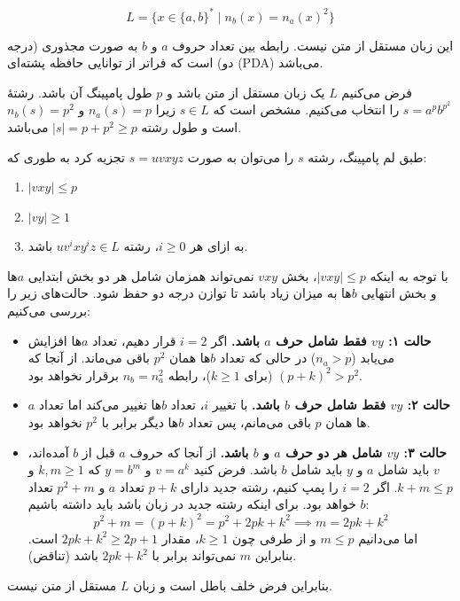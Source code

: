 \[
L = \{x \in \{a,b\}^* \mid n_b(x) = n_a(x)^2\}
\]

 این زبان مستقل از متن {نیست}. رابطه بین تعداد حروف $a$ و $b$ به صورت مجذوری (درجه دو) است که فراتر از توانایی حافظه پشته‌ای (PDA) می‌باشد.

فرض می‌کنیم $L$ یک زبان مستقل از متن باشد و $p$ طول پامپینگ آن باشد. 
رشتهٔ $s = a^p b^{p^2}$ را انتخاب می‌کنیم. مشخص است که $s \in L$ زیرا $n_a(s) = p$ و $n_b(s) = p^2$ است و طول رشته $|s| = p + p^2 \ge p$ می‌باشد.

طبق لم پامپینگ، رشته $s$ را می‌توان به صورت $s = uvxyz$ تجزیه کرد به طوری که:
\begin{enumerate}
    \item $|vxy| \le p$
    \item $|vy| \ge 1$
    \item به ازای هر $i \ge 0$، رشته $u v^i x y^i z \in L$ باشد.
\end{enumerate}

با توجه به اینکه $|vxy| \le p$، بخش $vxy$ نمی‌تواند همزمان شامل هر دو بخش ابتدایی $a$ها و بخش انتهایی $b$ها به میزان زیاد باشد تا توازن درجه دو حفظ شود. حالت‌های زیر را بررسی می‌کنیم:
\begin{itemize}
    \item \textbf{حالت ۱: $vy$ فقط شامل حرف $a$ باشد.}
    اگر $i=2$ قرار دهیم، تعداد $a$ها افزایش می‌یابد ($n_a > p$) در حالی که تعداد $b$ها همان $p^2$ باقی می‌ماند. از آنجا که $(p+k)^2 > p^2$ (برای $k \ge 1$)، رابطه $n_b = n_a^2$ برقرار نخواهد بود.
    
    \item \textbf{حالت ۲: $vy$ فقط شامل حرف $b$ باشد.}
    با تغییر $i$، تعداد $b$ها تغییر می‌کند اما تعداد $a$ها همان $p$ باقی می‌مانم، پس تعداد $b$ها دیگر برابر با $p^2$ نخواهد بود.
    
    \item \textbf{حالت ۳: $vy$ شامل هر دو حرف $a$ و $b$ باشد.}
    از آنجا که حروف $a$ قبل از $b$ آمده‌اند، $v$ باید شامل $a$ و $y$ باید شامل $b$ باشد. فرض کنید $v = a^k$ و $y = b^m$ که $k, m \ge 1$ و $k+m \le p$.
    اگر $i=2$ را پمپ کنیم، رشته جدید دارای $p+k$ تعداد $a$ و $p^2+m$ تعداد $b$ خواهد بود. برای اینکه رشته جدید در زبان باشد باید داشته باشیم:
    \[ p^2 + m = (p+k)^2 = p^2 + 2pk + k^2 \implies m = 2pk + k^2 \]
    اما می‌دانیم $m \le p$ و از طرفی چون $k \ge 1$، مقدار $2pk + k^2 \ge 2p + 1$ است. بنابراین $m$ نمی‌تواند برابر با $2pk + k^2$ باشد (تناقض).
\end{itemize}
بنابراین فرض خلف باطل است و زبان $L$ مستقل از متن نیست.

